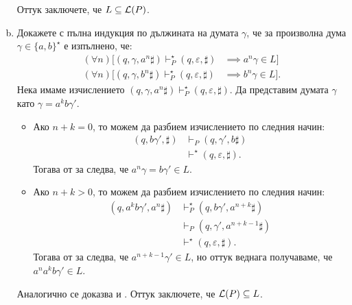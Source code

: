\begin{extra}
\begin{example}
\begin{enumerate}[a)]
    \fi
    Оттук заключете, че $L \subseteq \mathcal{L}(P)$.
  \item
    Докажете с пълна индукция по дължината на думата $\gamma$, че за произволна дума $\gamma \in \{a, b\}^\star$ е изпълнено, че:
    \begin{align}
      (\forall n)[(q, \gamma, a^n\sharp) \vdash^\star_P (q, \varepsilon, \sharp) & \implies a^n\gamma \in L] \label{eq:omega-ab:3}\\
      (\forall n)[(q, \gamma, b^n\sharp) \vdash^\star_P (q, \varepsilon, \sharp) & \implies b^n\gamma \in L]. \label{eq:omega-ab:4}
    \end{align}
    \ifhints
    Нека имаме изчислението $(q, \gamma, a^n\sharp) \vdash^\star_P (q, \varepsilon, \sharp)$.
    Да представим думата $\gamma$ като $\gamma = a^kb\gamma'$.
    
    \begin{itemize}
    \item
      Ако $n+k = 0$, то можем да разбием изчислението по следния начин:
      \begin{align*}
        (q, b\gamma', \sharp) & \vdash_P (q, \gamma',b\sharp) \\
                              & \vdash^{\star} (q,\varepsilon,\sharp).
      \end{align*}
      Тогава от \IndHyp за  следва, че $a^n\gamma = b\gamma' \in L$.
    \item
      Ако $n+k > 0$, то можем да разбием изчислението по следния начин:
      \begin{align*}
        (q, a^kb\gamma', a^n\sharp) & \vdash^\star_P (q, b\gamma',a^{n+k}\sharp) \\
                                    & \vdash_P (q, \gamma',a^{n+k-1}\sharp) \\
                                    & \vdash^{\star} (q,\varepsilon,\sharp).
      \end{align*}
      Тогава от \IndHyp за  следва, че $a^{n+k-1}\gamma' \in L$, но оттук
      веднага получаваме, че $a^na^kb\gamma' \in L$.
    \end{itemize}
    Аналогично се доказва и .
    \fi
    Оттук заключете, че $\mathcal{L}(P) \subseteq L$.
  \end{enumerate}
\end{example}


\end{extra}
